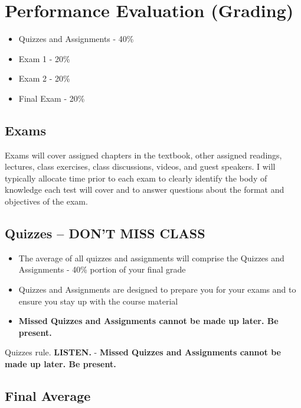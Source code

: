 \documentclass[
]{book}
\providecommand{\tightlist}{%
  \setlength{\itemsep}{0pt}\setlength{\parskip}{0pt}}
\theoremstyle{definition}
\theoremstyle{definition}
\theoremstyle{definition}
\theoremstyle{definition}
\theoremstyle{remark}
\begin{document}
\hypertarget{performance-evaluation-grading}{%
\section{Performance Evaluation (Grading)}\label{performance-evaluation-grading}}

\begin{itemize}
\tightlist
\item
  Quizzes and Assignments - 40\%
\item
  Exam 1 - 20\%
\item
  Exam 2 - 20\%
\item
  Final Exam - 20\%
\end{itemize}

\hypertarget{exams}{%
\subsection{Exams}\label{exams}}

Exams will cover assigned chapters in the textbook, other assigned readings, lectures, class exercises, class discussions, videos, and guest speakers. I will typically allocate time prior to each exam to clearly identify the body of knowledge each test will cover and to answer questions about the format and objectives of the exam.

\hypertarget{quizzes-dont-miss-class}{%
\subsection{\texorpdfstring{Quizzes -- \textbf{DON'T MISS CLASS}}{Quizzes -- DON'T MISS CLASS}}\label{quizzes-dont-miss-class}}

\begin{itemize}
\tightlist
\item
  The average of all quizzes and assignments will comprise the Quizzes and Assignments - 40\% portion of your final grade
\item
  Quizzes and Assignments are designed to prepare you for your exams and to ensure you stay up with the course material
\item
  \textbf{Missed Quizzes and Assignments cannot be made up later. Be present.}
\end{itemize}

Quizzes rule. \textbf{LISTEN.}
- \textbf{Missed Quizzes and Assignments cannot be made up later. Be present.}

\hypertarget{final-average}{%
\subsection{Final Average}\label{final-average}}
\end{document}
